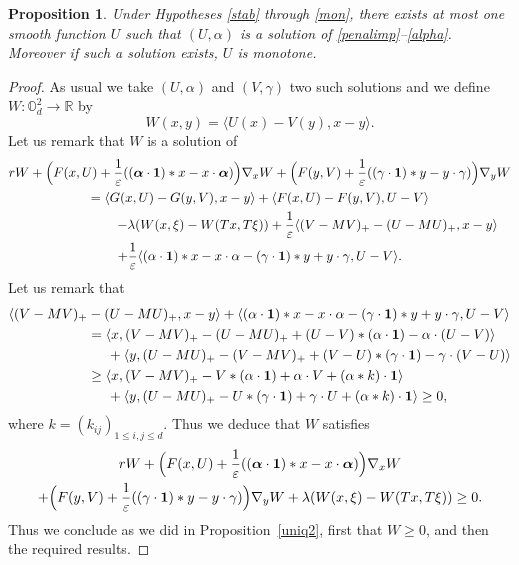 \documentclass[10pt]{amsart}
\newcommand{\One}{\mathbf{1}}
\let\epsilon\varepsilon
\newtheorem{Prop}{Proposition}[section]
\theoremstyle{definition}
\begin{document}
\begin{Prop}
Under Hypotheses \ref{stab} through \ref{mon}, there exists at most one smooth function $U$ such that $(U,\alpha)$ is a solution of \eqref{penalimp}--\eqref{alpha}. Moreover if such a solution exists, $U$ is monotone.
\end{Prop}
\begin{proof}
As usual we take $(U,\alpha)$ and $(V, \gamma)$ two such solutions and we define \hbox{$W: \mathbb{O}_d^2 \to \mathbb{R}$} by
\begin{equation*}
W(x,y) = \langle U(x)- V(y), x-y\rangle.
\end{equation*}
Let us remark that $W$ is a solution of
\begin{multline*}
r W + \Bigl(F(x,U)+\frac{1}{\epsilon} ((\boldsymbol{\alpha}\cdot\One)* x-x\cdot \boldsymbol{\alpha}) \Bigr)\nabla_x W+\Bigl(F(y,V)+\frac{1}{\epsilon} ((\gamma\cdot\One)* y-y\cdot \gamma) \Bigr)\nabla_y W\\
= \langle G(x,U)-G(y,V), x-y \rangle+\langle F(x,U)-F(y,V), U-V \rangle\\
\shoveright{- \lambda (W(x,\xi)-W(Tx,T\xi))
+\frac{1}{\epsilon}\langle (V-MV)_+-(U- MU)_+, x-y \rangle}\\
+\frac{1}{\epsilon} \langle(\alpha\cdot\One)* x-x\cdot \alpha -(\gamma\cdot\One)* y +y\cdot \gamma, U-V \rangle.
\end{multline*}
Let us remark that
\begin{equation*}
\begin{aligned}
\langle (V-MV)_+&-(U- MU)_+, x-y \rangle+\langle (\alpha\cdot\One)* x-x\cdot \alpha -(\gamma\cdot\One)* y +y\cdot \gamma, U-V \rangle\\
&=\langle x, (V-MV)_+-(U- MU)_++(U- V)* (\alpha\cdot\One)-\alpha \cdot (U-V) \rangle\\
&\hspace*{.5cm}+\langle y, (U-MU)_+-(V- MV)_++(V- U)* (\gamma\cdot\One)-\gamma \cdot (V-U) \rangle\\
&\geq\langle x, (V-MV)_+-V* (\alpha\cdot\One)+\alpha \cdot V+(\alpha*k)\cdot\One \rangle\\
&\hspace*{.5cm}+\langle y, (U-MU)_+-U* (\gamma\cdot\One)+\gamma \cdot U+(\alpha*k)\cdot \One \rangle\geq 0,
\end{aligned}
\end{equation*}
where $k = (k_{ij})_{1\leq i,j\leq d}$. Thus we deduce that $W$ satisfies
\begin{multline*}
r W +\Bigl(F(x,U)+\frac{1}{\epsilon} ((\boldsymbol{\alpha}\cdot\One)* x-x\cdot \boldsymbol{\alpha}) \Bigr)\nabla_x W\\
+\Bigl(F(y,V)+\frac{1}{\epsilon} ((\gamma\cdot\One)* y-y\cdot \gamma) \Bigr)\nabla_y W
+ \lambda(W(x,\xi)-W(Tx,T\xi)) \geq 0.
\end{multline*}
Thus we conclude as we did in Proposition~\ref{uniq2}, first that $W \geq 0$, and then the required results.
\end{proof}
\end{document}
